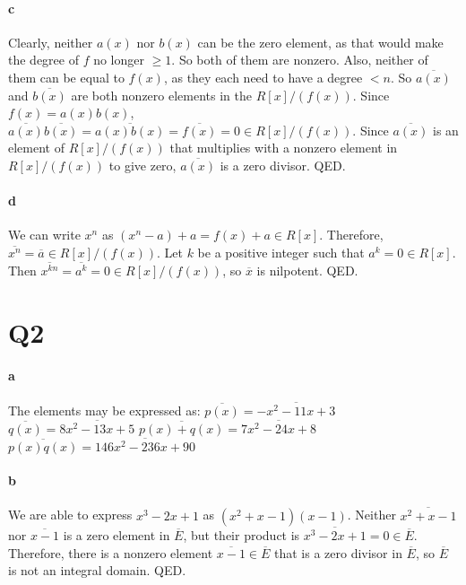 \documentclass[]{article}
\begin{document}
	\paragraph{c}
	Clearly, neither $a(x)$ nor $b(x)$ can be the zero element, as that would make the degree of $f$ no longer $\ge 1$. So both of them are nonzero.\newline
	Also, neither of them can be equal to $f(x)$, as they each need to have a degree $< n$. So $\overbar{a(x)}$ and $\overbar{b(x)}$ are both nonzero elements in the $R[x]/(f(x))$.\newline\newline
	Since $f(x) = a(x)b(x)$, $\overbar{a(x)}\overbar{b(x)} = \overbar{a(x)b(x)} = \overbar{f(x)} = 0 \in R[x]/(f(x))$.\newline
	Since $\overbar{a(x)}$ is an element of $R[x]/(f(x))$ that multiplies with a nonzero element in $R[x]/(f(x))$ to give zero, $\overbar{a(x)}$ is a zero divisor. QED.
	
	\paragraph{d}
	We can write $x^n$ as $(x^n - a) + a = f(x) + a \in R[x]$. Therefore, $\overbar{x^n} = \overbar{a} \in R[x]/(f(x))$.\newline
	Let $k$ be a positive integer such that $a^k = 0 \in R[x]$.\newline
	Then $\overbar{x^{kn}} = \overbar{a^k} = 0 \in R[x]/(f(x))$, so $\overbar{x}$ is nilpotent. QED.


\section*{Q2}
	\paragraph{a}
	The elements may be expressed as:\newline
	$\overbar{p(x)}        = \overbar{-x^2 - 11x + 3}$\newline
	$\overbar{q(x)}        = \overbar{8x^2 - 13x + 5}$\newline
	$\overbar{p(x) + q(x)} = \overbar{7x^2 - 24x + 8}$\newline
	$\overbar{p(x)q(x)}    = \overbar{146x^2 - 236x + 90}$\newline
	
	\paragraph{b}
	We are able to express $x^3 - 2x + 1$ as $(x^2 + x - 1)(x - 1)$.\newline
	Neither $\overbar{x^2 + x - 1}$ nor $\overbar{x - 1}$ is a zero element in $\overbar{E}$, but their product is $\overbar{x^3 - 2x + 1} = 0 \in \overbar{E}$.\newline
	Therefore, there is a nonzero element $\overbar{x - 1} \in \overbar{E}$ that is a zero divisor in $\overbar{E}$, so $\overbar{E}$ is not an integral domain. QED.
	
\end{document}
